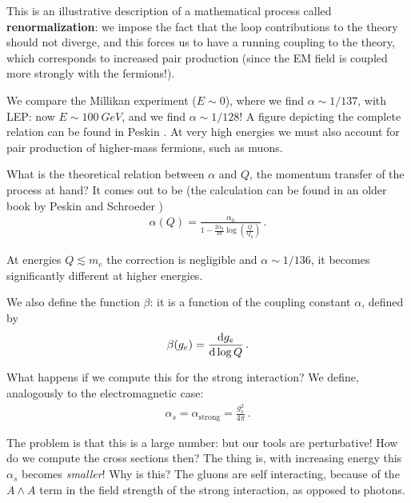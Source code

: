 \documentclass[main.tex]{subfiles}
\begin{document}
This is an illustrative description of a mathematical process called \textbf{renormalization}: we impose the fact that the loop contributions to the theory should not diverge, and this forces us to have a running coupling to the theory, which corresponds to increased pair production (since the EM field is coupled more strongly with the fermions!).

We compare the Millikan experiment (\(E \sim 0\)), where we find \(\alpha \sim 1/137\), with LEP: now \(E \sim \SI{100}{GeV}\), and we find \(\alpha \sim 1/128\)! 
A figure depicting the complete relation can be found in Peskin \cite[fig.\ 11.1]{peskinConceptsElementaryParticle2019}.
At very high energies we must also account for pair production of higher-mass fermions, such as muons.

What is the theoretical relation between \(\alpha \) and \(Q\), the momentum transfer of the process at hand? It comes out to be (the calculation can be found in an older book by Peskin and Schroeder \cite[sec.\ 7.5]{peskinIntroductionQuantumField1995})
%
\begin{align}
\alpha (Q) = \frac{\alpha_0 }{1 - \frac{2 \alpha_0 }{3 \pi } \log(\frac{Q}{Q_0 })}
\,.
\end{align}

At energies \(Q \lesssim m_e\) the correction is negligible and \(\alpha \sim 1/136\), it becomes significantly different at higher energies.

We also define the function \(\beta \): it is a function of the coupling constant \(\alpha \), defined by 
%
\begin{align}
\beta (g_e ) = \dv{g_e }{\log Q}
\,.
\end{align}

What happens if we compute this for the strong interaction? We define, analogously to the electromagnetic case: 
%
\begin{align}
\alpha_s = \alpha _{\text{strong}} = \frac{g^2_{s}}{4 \pi }
\,.
\end{align}

The problem is that this is a large number: but our tools are perturbative! How do we compute the cross sections then? 
The thing is, with increasing energy this \(\alpha_s \) becomes \emph{smaller}!
Why is this? The gluons are self interacting, because of the \(A \wedge A\) term in the field strength of the strong interaction, as opposed to photons. 
\end{document}
